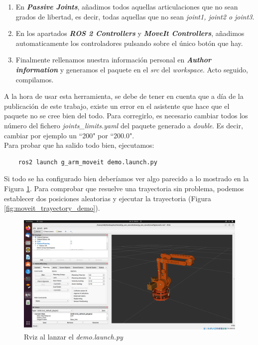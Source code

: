 \begin{enumerate}
\item En \textbf{\textit{\guillemotleft Passive Joints\guillemotright}}, añadimos todos aquellas articulaciones que no sean grados de libertad, 
es decir, todas aquellas que no sean \textit{joint1, joint2 o joint3}.

\item En los apartados \textbf{\textit{\guillemotleft ROS 2 Controllers\guillemotright}} y 
\textbf{\textit{\guillemotleft MoveIt Controllers\guillemotright}}, añadimos automaticamente los controladores pulsando sobre el único botón que hay.

\item Finalmente rellenamos nuestra información personal en \textbf{\textit{\guillemotleft Author information\guillemotright}} y generamos el 
paquete en el \textit{src} del \textit{workspace}. Acto seguido, compilamos.
\end{enumerate}

A la hora de usar esta herramienta, se debe de tener en cuenta que a día de la publicación de este trabajo, existe un error en el asistente
que hace que el paquete no se cree bien del todo. Para corregirlo, es necesario cambiar todos los número del fichero \textit{joints\_limits.yaml}
del paquete generado a \textit{double}. Es decir, cambiar por ejemplo un ``200" por ``200.0".
\\

Para probar que ha salido todo bien, ejecutamos:
\begin{verbatim}
    ros2 launch g_arm_moveit demo.launch.py
\end{verbatim}
Si todo se ha configurado bien deberíamos ver algo parecido a lo mostrado en la Figura \ref{fig:moveit_demo}. Para comprobar que resuelve una trayectoria sin 
problema, podemos establecer dos posiciones aleatorias y ejecutar la trayectoria (Figura \ref{fig:moveit_trayectory_demo}).
\begin{figure} [ht!]
    \begin{center}
      \includegraphics[width=15cm]{figs/moveit_demo.png}
    \end{center}
    \caption{Rviz al lanzar el \textit{demo.launch.py}}
    \label{fig:moveit_demo}
\end{figure}\ 


